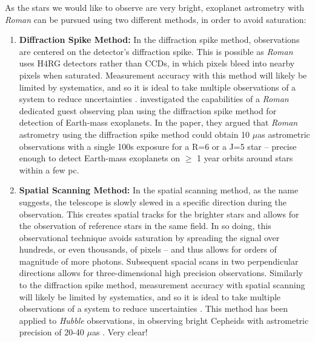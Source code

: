 \documentclass[twocolumn]{aastex631}
\newcommand{\racomment}[1]{{\color{blue}#1}}
\begin{document}
As the stars we would like to observe are very bright, exoplanet astrometry with \textit{Roman} can be pursued using two different methods, in order to avoid saturation:
\begin{enumerate}

    \item \textbf{Diffraction Spike Method:} In the diffraction spike method, observations are centered on the detector's diffraction spike. This is possible as \textit{Roman} uses H4RG detectors rather than CCDs, in which pixels bleed into nearby pixels when saturated. Measurement accuracy with this method will likely be limited by systematics, and so it is ideal to take multiple observations of a system to reduce uncertainties \citep{Sanderson2019}. \citet{Melchior2018} investigated the capabilities of a \textit{Roman} dedicated guest observing plan using the diffraction spike method for detection of Earth-mass exoplanets. In the paper, they argued that \textit{Roman} astrometry using the diffraction spike method could obtain 10 $\mu$as astrometric observations with a single 100s exposure for a R=6 or a J=5 star -- precise enough to detect Earth-mass exoplanets on $\geq$ 1 year orbits around stars within a few pc.
    
    \item \textbf{Spatial Scanning Method:} In the spatial scanning method, as the name suggests, the telescope is slowly slewed in a specific direction during the observation. This creates spatial tracks for the brighter stars and allows for the observation of reference stars in the same field. In so doing, this observational technique avoids saturation by spreading the signal over hundreds, or even thousands, of pixels -- and thus allows for orders of magnitude of more photons. Subsequent spacial scans in two perpendicular directions allows for three-dimensional high precision observations. Similarly to the diffraction spike method, measurement accuracy with spatial scanning will likely be limited by systematics, and so it is ideal to take multiple observations of a system to reduce uncertainties \citep{Sanderson2019}. This method has been applied to \textit{Hubble} observations, in observing bright Cepheids with astrometric precision of 20-40 $\mu$as \citep{Riess2014}.
    \racomment{Very clear!}

\end{enumerate}
\end{document}
